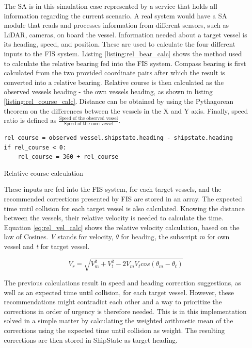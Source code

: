 The SA is in this simulation case represented by a service that holds all information regarding the current scenario. A real system would have a SA module that reads and processes information from different sensors, such as LiDAR, cameras, on board the vessel. Information needed about a target vessel is its heading, speed, and position. These are used to calculate the four different inputs to the FIS system. Listing \ref{listing:rel_bear_calc} shows the method used to calculate the relative bearing fed into the FIS system. Compass bearing is first calculated from the two provided coordinate pairs after which the result is converted into a relative bearing. Relative course is then calculated as the observed vessels heading - the own vessels heading, as shown in listing \ref{listing:rel_course_calc}. Distance can be obtained by using the Pythagorean theorem on the differences between the vessels in the X and Y axis. Finally, speed ratio is defined as $\frac{\text{Speed of the observed vessel}}{\text{Speed of the own vessel}}$.
\begin{listing}

    \begin{verbatim}
rel_course = observed_vessel.shipstate.heading - shipstate.heading
if rel_course < 0:
    rel_course = 360 + rel_course
    \end{verbatim}
    \caption{Relative course calculation}
    \label{listing:rel_course_calc}
\end{listing}

These inputs are fed into the FIS system, for each target vessels, and the recommended corrections presented by FIS are stored in an array. The expected time until collision for each target vessel is also calculated. Knowing the distance between the vessels, their relative velocity is needed to calculate the time. Equation \ref{eq:rel_vel_calc} shows the relative velocity calculation, based on the law of Cosines. \textit{V} stands for velocity, $\theta$ for heading, the subscript \textit{m} for own vessel and \textit{t} for target vessel.

\begin{equation}
    V_r=\sqrt{V_m^2 + V_t^2-2  V_mV_tcos(\theta_m-\theta_t)}
    \label{eq:rel_vel_calc}
\end{equation}

The previous calculations result in speed and heading correction suggestions, as well as an expected time until collision, for each target vessel. However, these recommendations might contradict each other and a way to prioritize the corrections in order of urgency is therefore needed. This is in this implementation solved in a simple matter by calculating the weighted arithmetic mean of the corrections using the expected time until collision as weight. The resulting corrections are then stored in ShipState as target heading.

